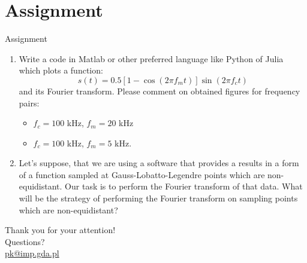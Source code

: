 \documentclass[10pt,aspectratio=169]{beamer} %
\begin{document}
\section{Assignment}
\begin{frame}{Assignment}
\begin{enumerate}	
	\item Write a code in Matlab or other preferred language like Python of Julia which plots a function:
	\begin{equation*}
	s(t) = 0.5 \left[1 - \cos(2 \pi f_m t) \right] \sin(2 \pi f_c t)
	\end{equation*}
	and its Fourier transform. 
	Please comment on obtained figures for frequency pairs:
	\begin{itemize}
		\item \(f_c = 100\) kHz,  \(f_m = 20\) kHz
		\item \(f_c = 100\) kHz,  \(f_m = 5\) kHz.
	\end{itemize}
  \item Let's suppose, that we are using a software that provides a results in a form of a function sampled at Gauss-Lobatto-Legendre points which are non-equidistant.
  Our task is to perform the Fourier transform of that data. 
  What will be the strategy of performing the Fourier transform on sampling points which are non-equidistant? \\
  \vspace{5mm}
  
\end{enumerate}
\end{frame}
\note{}
{
\begin{frame}[standout]
  Thank you for your attention!\\ \vspace{12pt}
  Questions?\\ \vspace{12pt}
  \url{pk@imp.gda.pl}
\end{frame}
}
\end{document}
